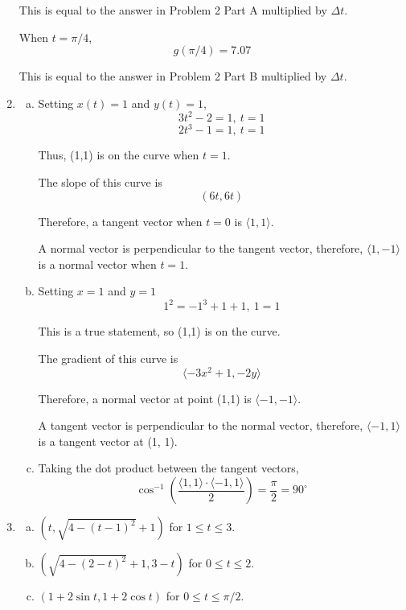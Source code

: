 \documentclass{article}
\begin{document}
\begin{enumerate}[1.]
    This is equal to the answer in Problem 2 Part A multiplied by $\Delta t$.

    \bigbreak

    When $t = \pi / 4$,
    $$ g(\pi / 4) = 7.07 $$

    This is equal to the answer in Problem 2 Part B multiplied by $\Delta t$.

  \item \begin{enumerate}[a.]
      \item Setting $x(t) = 1$ and $y(t) = 1$,
        $$ 3t^{2} - 2 = 1,\ t = 1 $$
        $$ 2t^{3} - 1 = 1,\ t = 1 $$

        Thus, (1,1) is on the curve when $t = 1$.

        \bigbreak

        The slope of this curve is
        $$ (6t, 6t) $$

        Therefore, a tangent vector when $t = 0$ is $\langle 1, 1 \rangle$.

        \bigbreak

        A normal vector is perpendicular to the tangent vector, therefore,
        $\langle 1, -1 \rangle$ is a normal vector when $t = 1$.
      \item Setting $x = 1$ and $y = 1$
        $$ 1^{2} = -1^{3} + 1 + 1,\ 1 = 1 $$

        This is a true statement, so (1,1) is on the curve.

        \bigbreak

        The gradient of this curve is
        $$ \langle -3x^{2} + 1, -2y \rangle$$

        Therefore, a normal vector at point (1,1) is $\langle -1, -1 \rangle$.

        \bigbreak

        A tangent vector is perpendicular to the normal vector, therefore,
        $\langle -1, 1 \rangle$ is a tangent vector at (1, 1).

      \item Taking the dot product between the tangent vectors,
        $$ \cos^{-1}\left( \frac{ \langle 1, 1 \rangle \cdot \langle -1, 1
        \rangle }{ 2 }\right) = \frac{ \pi }{ 2 } = 90^{\circ}$$
    \end{enumerate}
  \item \begin{enumerate}[a.]
    \item $(t, \sqrt{4 - (t - 1)^{2}} + 1)$ for $1 \leq t \leq 3$.
    \item $(\sqrt{4 - (2 - t)^{2}} + 1, 3 - t)$ for $0 \leq t \leq 2$.
    \item $(1 + 2 \sin t, 1 + 2 \cos t)$ for $0 \leq t \leq \pi / 2$.
  \end{enumerate}
\end{enumerate}
\end{document}
